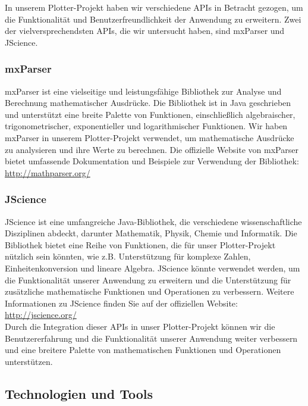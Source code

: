 \documentclass[a4paper]{article}
\begin{document}
In unserem Plotter-Projekt haben wir verschiedene APIs in Betracht gezogen, um die Funktionalität und Benutzerfreundlichkeit der Anwendung zu erweitern. Zwei der vielversprechendsten APIs, die wir untersucht haben, sind mxParser und JScience.

\subsubsection{mxParser}

mxParser ist eine vielseitige und leistungsfähige Bibliothek zur Analyse und Berechnung mathematischer Ausdrücke. Die Bibliothek ist in Java geschrieben und unterstützt eine breite Palette von Funktionen, einschließlich algebraischer, trigonometrischer, exponentieller und logarithmischer Funktionen. Wir haben mxParser in unserem Plotter-Projekt verwendet, um mathematische Ausdrücke zu analysieren und ihre Werte zu berechnen. Die offizielle Website von mxParser bietet umfassende Dokumentation und Beispiele zur Verwendung der Bibliothek: \url{http://mathparser.org/}

\subsubsection{JScience}

JScience ist eine umfangreiche Java-Bibliothek, die verschiedene wissenschaftliche Disziplinen abdeckt, darunter Mathematik, Physik, Chemie und Informatik. Die Bibliothek bietet eine Reihe von Funktionen, die für unser Plotter-Projekt nützlich sein könnten, wie z.B. Unterstützung für komplexe Zahlen, Einheitenkonversion und lineare Algebra. JScience könnte verwendet werden, um die Funktionalität unserer Anwendung zu erweitern und die Unterstützung für zusätzliche mathematische Funktionen und Operationen zu verbessern. Weitere Informationen zu JScience finden Sie auf der offiziellen Website: \url{http://jscience.org/}\\

Durch die Integration dieser APIs in unser Plotter-Projekt können wir die Benutzererfahrung und die Funktionalität unserer Anwendung weiter verbessern und eine breitere Palette von mathematischen Funktionen und Operationen unterstützen.

\newpage

\subsection{Technologien und Tools}
\end{document}
